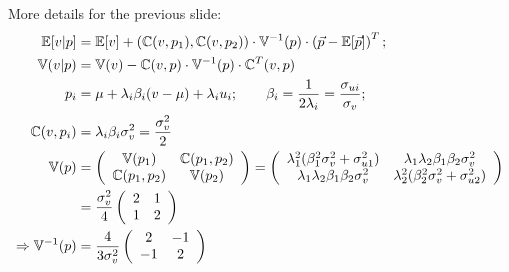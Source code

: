 \documentclass[english,10pt
,aspectratio=169
]{beamer}
\begin{document}
\begin{frame}
	More details for the previous slide:
	\begin{align*}
		\mathbb{E}[v|p] &= \mathbb{E}[v] + (\mathbb{C}(v,p_1), \mathbb{C}(v,p_2)) \cdot \mathbb{V}^{-1}(p) \cdot \left(\vec{p} - \mathbb{E}[\vec{p}] \right)^T;
		\\
		\mathbb{V}(v|p) &= \mathbb{V}(v) - \mathbb{C}(v,p) \cdot \mathbb{V}^{-1}(p) \cdot \mathbb{C}^T(v,p)
		\\
		p_i &= \mu + \lambda_i \beta_i (v-\mu) + \lambda_i u_i; \qquad \beta_i = \frac{1}{2\lambda_i} = \frac{\sigma_{ui}}{\sigma_v};
		\\
		\mathbb{C}(v,p_i) &= \lambda_i \beta_i \sigma_v^2 = \frac{\sigma_v^2}{2}
		\\
		\mathbb{V}(p) &= \left(
			\begin{array}{c c}
				\mathbb{V}(p_1)		& \mathbb{C}(p_1,p_2)
				\\
				\mathbb{C}(p_1,p_2)	& \mathbb{V}(p_2)	
			\end{array}
		\right) = \left(
			\begin{array}{c c}
				\lambda_1^2 (\beta_1^2\sigma_v^2 + \sigma_{u1}^2)	& \lambda_1 \lambda_2 \beta_1 \beta_2 \sigma_v^2
				\\
				\lambda_1 \lambda_2 \beta_1 \beta_2 \sigma_v^2	& \lambda_2^2 (\beta_2^2\sigma_v^2 + \sigma_{u2}^2)
			\end{array}
		\right)
		\\
		&= \frac{\sigma_v^2}{4} \left(
			\begin{array}{c c}
				2	& 1
				\\
				1	& 2
			\end{array}
		\right)
		\\
		\Rightarrow \mathbb{V}^{-1}(p) &= \frac{4}{3 \sigma_v^2} \left(
			\begin{array}{c c}
				2	& -1
				\\
				-1	& 2
			\end{array}
		\right)
	\end{align*}
\end{frame}
\end{document}
